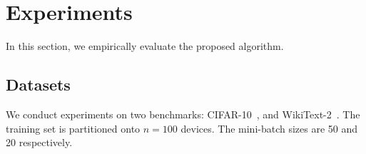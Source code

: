 \documentclass{opt2020} %
\begin{document}



\section{Experiments}

In this section, we empirically evaluate the proposed algorithm.

\subsection{Datasets}
We conduct experiments on two benchmarks: CIFAR-10~\cite{krizhevsky2009learning}, and WikiText-2~\cite{merity2016pointer}. The training set is partitioned onto $n=100$ devices.
The mini-batch sizes are 50 and 20 respectively.

\end{document}
